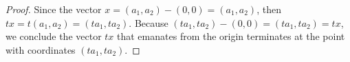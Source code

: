 \begin{Exercise}
\begin{proof}
Since the vector $x = (a_1,a_2)-(0,0) = (a_1,a_2)$, then $t x = t(a_1,a_2) = (t a_1, t a_2)$. Because $(t a_1, t a_2) - (0,0) = (t a_1, t a_2) = t x$, we conclude the vector $t x$ that emanates from the origin terminates at the point with coordinates $(t a_1, t a_2)$.
\end{proof}
\end{Exercise}